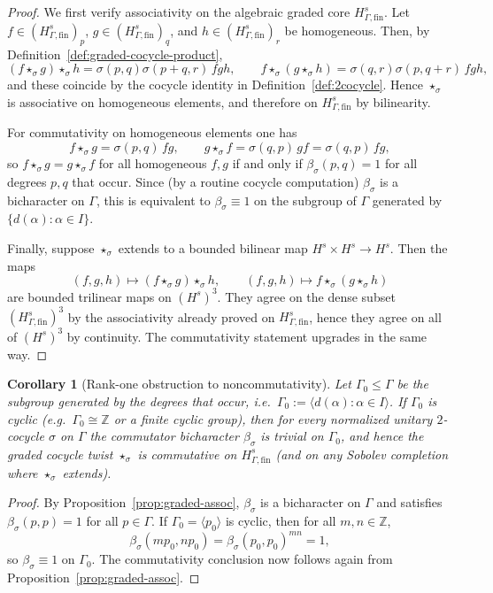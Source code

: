 \documentclass[11pt]{amsart}
\theoremstyle{plain}
\newtheorem{corollary}[theorem]{Corollary}
\theoremstyle{definition}
\theoremstyle{remark}
\newcommand{\bbZ}{\mathbb{Z}}
\begin{document}
\begin{proof}
We first verify associativity on the algebraic graded core $H^s_{\Gamma,\mathrm{fin}}$.
Let $f\in (H^s_{\Gamma,\mathrm{fin}})_p$, $g\in (H^s_{\Gamma,\mathrm{fin}})_q$, and $h\in (H^s_{\Gamma,\mathrm{fin}})_r$ be homogeneous.
Then, by Definition~\ref{def:graded-cocycle-product},
\[
(f\star_\sigma g)\star_\sigma h
=\sigma(p,q)\sigma(p+q,r)\,fgh,
\qquad
f\star_\sigma(g\star_\sigma h)
=\sigma(q,r)\sigma(p,q+r)\,fgh,
\]
and these coincide by the cocycle identity in Definition~\ref{def:2cocycle}. Hence $\star_\sigma$ is associative on homogeneous elements,
and therefore on $H^s_{\Gamma,\mathrm{fin}}$ by bilinearity.

For commutativity on homogeneous elements one has
\[
f\star_\sigma g=\sigma(p,q)\,fg,\qquad
g\star_\sigma f=\sigma(q,p)\,gf=\sigma(q,p)\,fg,
\]
so $f\star_\sigma g=g\star_\sigma f$ for all homogeneous $f,g$ if and only if $\beta_\sigma(p,q)=1$
for all degrees $p,q$ that occur.  Since (by a routine cocycle computation) $\beta_\sigma$ is a bicharacter on $\Gamma$,
this is equivalent to $\beta_\sigma\equiv 1$ on the subgroup of $\Gamma$ generated by $\{d(\alpha):\alpha\in I\}$.

Finally, suppose $\star_\sigma$ extends to a bounded bilinear map $H^s\times H^s\to H^s$.
Then the maps
\[
(f,g,h)\longmapsto (f\star_\sigma g)\star_\sigma h,
\qquad
(f,g,h)\longmapsto f\star_\sigma(g\star_\sigma h)
\]
are bounded trilinear maps on $(H^s)^3$.
They agree on the dense subset $(H^s_{\Gamma,\mathrm{fin}})^3$ by the associativity already proved on $H^s_{\Gamma,\mathrm{fin}}$,
hence they agree on all of $(H^s)^3$ by continuity. The commutativity statement upgrades in the same way.
\end{proof}

\begin{corollary}[Rank-one obstruction to noncommutativity]\label{cor:rank-one}
Let $\Gamma_0\le \Gamma$ be the subgroup generated by the degrees that occur, i.e.\ $\Gamma_0:=\langle d(\alpha):\alpha\in I\rangle$.
If $\Gamma_0$ is cyclic (e.g.\ $\Gamma_0\cong\bbZ$ or a finite cyclic group), then for every normalized unitary $2$-cocycle $\sigma$ on $\Gamma$ the commutator bicharacter
$\beta_\sigma$ is trivial on $\Gamma_0$, and hence the graded cocycle twist $\star_\sigma$ is commutative on $H^s_{\Gamma,\mathrm{fin}}$
(and on any Sobolev completion where $\star_\sigma$ extends).
\end{corollary}

\begin{proof}
By Proposition~\ref{prop:graded-assoc}, $\beta_\sigma$ is a bicharacter on $\Gamma$ and satisfies $\beta_\sigma(p,p)=1$ for all $p\in\Gamma$.
If $\Gamma_0=\langle p_0\rangle$ is cyclic, then for all $m,n\in\bbZ$,
\[
\beta_\sigma(mp_0,np_0)=\beta_\sigma(p_0,p_0)^{mn}=1,
\]
so $\beta_\sigma\equiv 1$ on $\Gamma_0$. The commutativity conclusion now follows again from Proposition~\ref{prop:graded-assoc}.
\end{proof}
\end{document}
